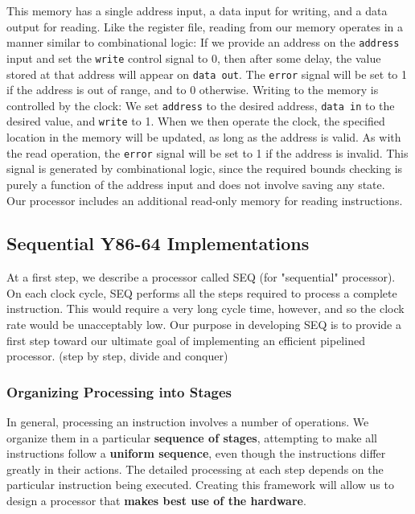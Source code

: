 \documentclass[11pt]{article}
\begin{document}
This memory has a single address input, a data input for writing, and a data output for reading. Like the register file, reading from our memory operates in a manner similar to combinational logic: If we provide an address on the \texttt{address} input and set the \texttt{write} control signal to 0, then after some delay, the value stored at that address will appear on \texttt{data out}. The \texttt{error} signal will be set to 1 if the address is out of range, and to 0 otherwise. Writing to the memory is controlled by the clock: We set \texttt{address} to the desired address, \texttt{data in} to the desired value, and \texttt{write} to 1. When we then operate the clock, the specified location in the memory will be updated, as long as the address is valid. As with the read operation, the \texttt{error} signal will be set to 1 if the address is invalid. This signal is generated by combinational logic, since the required bounds checking is purely a function of the address input and does not involve saving any state.\\

Our processor includes an additional read-only memory for reading instructions.\\

\subsection{Sequential Y86-64 Implementations}
\label{sec:orgb10a1ab}
At a first step, we describe a processor called SEQ (for "sequential" processor). On each clock cycle, SEQ performs all the steps required to process a complete instruction. This would require a very long cycle time, however, and so the clock rate would be unacceptably low. Our purpose in developing SEQ is to provide a first step toward our ultimate goal of implementing an efficient pipelined processor. (step by step, divide and conquer)\\

\subsubsection{Organizing Processing into Stages}
\label{sec:orgc3fa38e}

In general, processing an instruction involves a number of operations. We organize them in a particular \textbf{sequence of stages}, attempting to make all instructions follow a \textbf{uniform sequence}, even though the instructions differ greatly in their actions. The detailed processing at each step depends on the particular instruction being executed. Creating this framework will allow us to design a processor that \textbf{makes best use of the hardware}.\\
\end{document}
